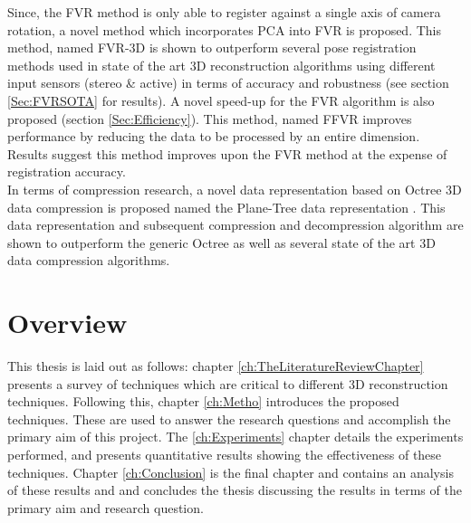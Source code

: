 Since, the FVR method is only able to register against a single axis of camera rotation, a novel method which incorporates PCA into FVR is proposed. This method, named FVR-3D is shown to outperform several pose registration methods used in state of the art 3D reconstruction algorithms using different input sensors (stereo \& active) in terms of accuracy and robustness (see section \ref{Sec:FVRSOTA} for results). A novel speed-up for the FVR algorithm is also proposed (section \ref{Sec:Efficiency}). This method, named FFVR improves performance by reducing the data to be processed by an entire dimension. Results suggest this method improves upon the FVR method at the expense of registration accuracy. \\

In terms of compression research, a novel data representation based on Octree 3D data compression is proposed named the Plane-Tree data representation \cite{Lincoln15Plane}. This data representation and subsequent compression and decompression algorithm are shown to outperform the generic Octree as well as several state of the art 3D data compression algorithms. \\


\section{Overview}

This thesis is laid out as follows: chapter \ref{ch:TheLiteratureReviewChapter} presents a survey of techniques which are critical to different 3D reconstruction techniques. Following this, chapter \ref{ch:Metho} introduces the proposed techniques. These are used to answer the research questions and accomplish the primary aim of this project. The \ref{ch:Experiments} chapter details the experiments performed, and presents quantitative results showing the effectiveness of these techniques. Chapter \ref{ch:Conclusion} is the final chapter and contains an analysis of these results and and concludes the thesis discussing the results in terms of the primary aim and research question. 


